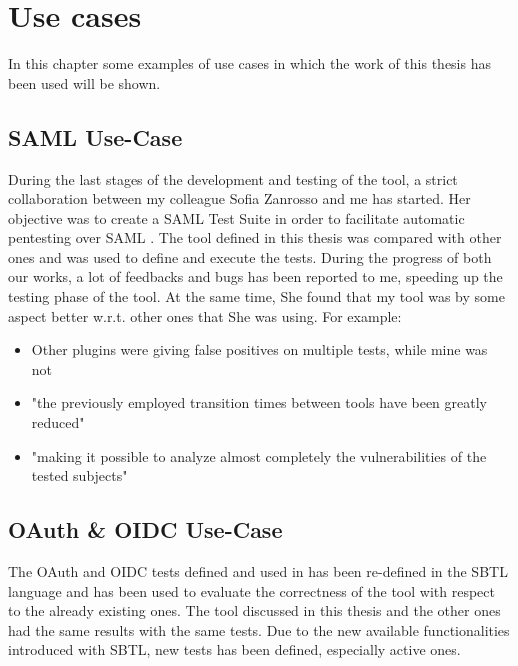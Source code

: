 \chapter{Use cases}
\label{chap:Use_cases}
In this chapter some examples of use cases in which the work of this thesis has been used will be shown.

\section{SAML Use-Case}
During the last stages of the development and testing of the tool, a strict collaboration between my colleague Sofia Zanrosso and me has started. Her objective was to create a SAML Test Suite in order to facilitate automatic pentesting over SAML \cite{sofia_zanrosso}. The tool defined in this thesis was compared with other ones and was used to define and execute the tests. During the progress of both our works, a lot of feedbacks and bugs has been reported to me, speeding up the testing phase of the tool. At the same time, She found that my tool was by some aspect better w.r.t. other ones that She was using. For example:
\begin{itemize}
    \item Other plugins were giving false positives on multiple tests, while mine was not
    \item "the previously employed transition times between tools have been greatly reduced"
    \item "making it possible to analyze almost completely the vulnerabilities of the tested subjects"
\end{itemize}


\section{OAuth \& OIDC Use-Case}    
The \Gls{OAuth} and \Gls{OIDC} tests defined and used in \cite{claudio_grisenti,wendy_barreto} has been re-defined in the SBTL language and has been used to evaluate the correctness of the tool with respect to the already existing ones. The tool discussed in this thesis and the other ones had the same results with the same tests. Due to the new available functionalities introduced with SBTL, new tests has been defined, especially active ones.






